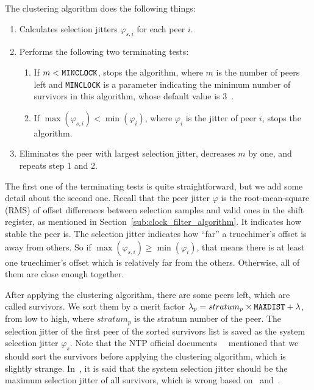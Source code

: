 The clustering algorithm does the following things:
\begin{enumerate}
    \item Calculates selection jitters $\varphi_{s, i}$ for each peer $i$.
    \item Performs the following two terminating tests:
        \begin{enumerate}
            \item If $m < \verb|MINCLOCK|$, stops the algorithm, where $m$ is
                the number of peers left and \verb|MINCLOCK| is a parameter
                indicating the minimum number of survivors in this algorithm,
                whose default value is 3~\cite{rfc5905}.
            \item If $\max(\varphi_{s,i}) < \min(\varphi_i)$, where
                $\varphi_i$ is the jitter of peer $i$, stops the
                algorithm.
        \end{enumerate}
    \item Eliminates the peer with largest selection jitter, decreases $m$
        by one, and repeats step 1 and 2.
\end{enumerate}
The first one of the terminating tests is quite straightforward, but we add some
detail about the second one. Recall that the peer jitter $\varphi$ is the
root-mean-square (RMS) of offset differences between selection samples and
valid ones in the shift register, as mentioned in
Section~\ref{sub:clock_filter_algorithm}. It indicates how stable the peer is.
The selection jitter indicates how ``far'' a truechimer's offset is away from
others.  So if $\max(\varphi_{s,i}) \ge \min(\varphi_i)$, that means there is at
least one truechimer's offset which is relatively far from the others. Otherwise,
all of them are close enough together.

After applying the clustering algorithm, there are some peers left, which are
called survivors. We sort them by a merit factor $\lambda_p = stratum_p \times
\verb|MAXDIST| + \lambda$, from low to high, where $stratum_p$ is the stratum
number of the peer. The selection jitter of the first peer of the sorted
survivors list is saved as the system selection jitter $\varphi_s$. Note that
the NTP official documents~\cite{redbook}~\cite{rfc5905} mentioned that we
should sort the survivors before applying the clustering algorithm, which is
slightly strange. In~\cite{rfc5905}, it is said that the system selection
jitter should be the maximum selection jitter of all survivors, which is wrong
based on~\cite{redbook} and~\cite{source_code}.

